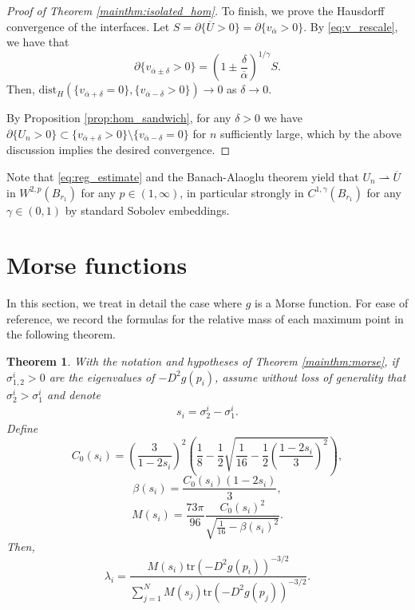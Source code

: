 \documentclass[10pt,a4paper]{article}
\newtheorem{thm}{Theorem}[section]
\numberwithin{equation}{section}
\begin{document}
\begin{proof}[Proof of Theorem \ref{mainthm:isolated_hom}]
	To finish, we prove the Hausdorff convergence of the interfaces. Let $ S = \partial\{\overline{U} > 0\} = \partial\{v_{\overline{\alpha}} > 0\} $. By \eqref{eq:v_rescale}, we have that 
	\[
		\partial\{v_{\overline{\alpha} \pm \delta} > 0\} = \left( 1 \pm \frac{\delta}{\overline{\alpha}} \right)^{1/\gamma} S.
	\]
	Then, $ \mathrm{dist}_H(\{v_{\overline{\alpha} + \delta} = 0\}, \{v_{\overline{\alpha} - \delta} > 0\}) \rightarrow 0 $ as $ \delta \rightarrow 0 $. 

	By Proposition \ref{prop:hom_sandwich}, for any $ \delta > 0 $ we have $ \partial \{U_n > 0\} \subset \{v_{\overline{\alpha} + \delta} > 0\} \setminus \{v_{\overline{\alpha} - \delta} = 0\}$ for $ n $ sufficiently large, which by the above discussion implies the desired convergence.
\end{proof}

Note that \eqref{eq:reg_estimate} and the Banach-Alaoglu theorem yield that $U_n \rightharpoonup \overline{U}$ in $W^{2,p}(B_{r_1})$ for any $p \in (1, \infty)$, in particular strongly in $C^{1,\gamma}(B_{r_1})$ for any $\gamma \in (0,1)$ by standard Sobolev embeddings.

\section{Morse functions}
\label{ssect:quadratic}

In this section, we treat in detail the case where $ g $ is a Morse function. For ease of reference, we record the formulas for the relative mass of each maximum point in the following theorem.

\begin{thm}
	\label{thm:lambda_i}
	With the notation and hypotheses of Theorem \ref{mainthm:morse}, if $ \sigma^i_{1,2} > 0 $ are the eigenvalues of $- D^2g(p_i) $, assume without loss of generality that $ \sigma^i_2 > \sigma_1^i $ and denote
	\[
		\begin{array}{cc}
			s_i = \sigma^i_2 - \sigma^i_1.
		\end{array}
	\]
Define
\begin{equation}
\label{eq:C0}
	C_0(s_i) = \left( \frac{3}{1-2s_i} \right)^{2} \left( \frac{1}{8} - \frac{1}{2}\sqrt{\frac{1}{16} - \frac{1}{2} \left( \frac{1-2s_i}{3} \right)^{2}} \right), 
\end{equation}
\begin{equation}
	\label{eq:beta}
	\beta(s_i) = \frac{C_0(s_i) (1-2s_i)}{3},
\end{equation}
\begin{equation}
	\label{eq:mass}
	M(s_i) = \frac{73\pi}{96} \frac{C_0(s_i)^2}{\sqrt{\frac{1}{16} - \beta(s_i)^2}}.
\end{equation}
Then,
\begin{equation}
	\label{eq:lambda_i}
	\lambda_i = \frac{M(s_i) \mathrm{tr}(-D^2 g(p_i))^{-3/2}}{\sum_{j=1}^{N} M(s_j) \mathrm{tr}(-D^2 g(p_j))^{-3/2}}. 
\end{equation}
\end{thm}
\end{document}
